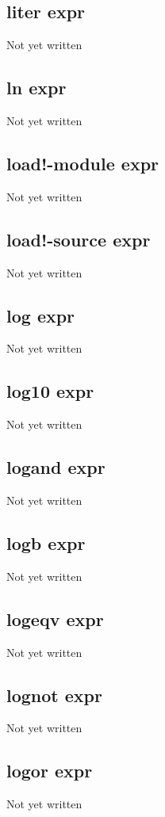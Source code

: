 \documentclass[a4paper,11pt]{article}
\begin{document}
{\subsection{\ttfamily liter expr}
   Not yet written

\subsection{\ttfamily ln expr}
   Not yet written

\subsection{\ttfamily load!-module expr}
   Not yet written

\subsection{\ttfamily load!-source expr}
   Not yet written

\subsection{\ttfamily log expr}
   Not yet written

\subsection{\ttfamily log10 expr}
   Not yet written

\subsection{\ttfamily logand expr}
   Not yet written

\subsection{\ttfamily logb expr}
   Not yet written

\subsection{\ttfamily logeqv expr}
   Not yet written

\subsection{\ttfamily lognot expr}
   Not yet written

\subsection{\ttfamily logor expr}
   Not yet written

}
\end{document}
